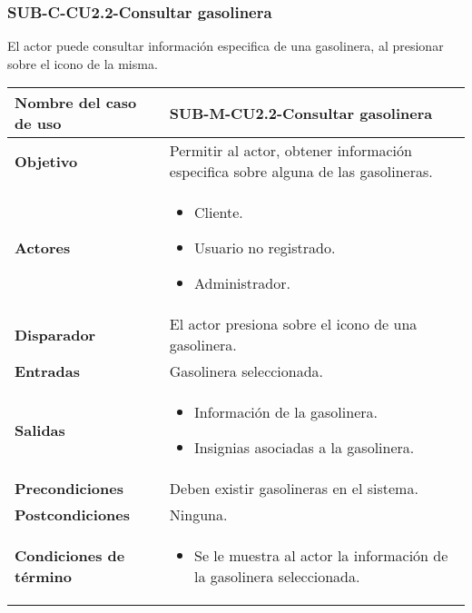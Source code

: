 \subsubsection{SUB-C-CU2.2-Consultar gasolinera}\label{SUB-C-CU2.2}
El actor puede consultar información especifica de una gasolinera, al presionar sobre el icono de la misma.

\begin{longtable}{|J{5cm}|J{10.3cm}|}
	\hline
	\textbf{Nombre del caso de uso} &
		SUB-M-CU2.2-Consultar gasolinera \\ \hline
	\textbf{Objetivo} &
		Permitir al actor, obtener información especifica sobre alguna de las gasolineras. \\ \hline
	\textbf{Actores} &
		\begin{itemize}
			\item Cliente.
			\item Usuario no registrado.
			\item Administrador.
		\end{itemize}
		 \\ \hline 
	\textbf{Disparador} & 
		El actor presiona sobre el icono de una gasolinera. \\ \hline 
	\textbf{Entradas} & Gasolinera seleccionada.
		\\ \hline 
	\textbf{Salidas} & 
		\begin{itemize}
			\item Información de la gasolinera.
			\item Insignias asociadas a la gasolinera.
		\end{itemize} \\ \hline
	\textbf{Precondiciones} &
		Deben existir gasolineras en el sistema.\\ \hline
	\textbf{Postcondiciones} & Ninguna.
		\\ \hline
	\textbf{Condiciones de término} & 
		\begin{itemize}
			\item Se le muestra al actor la información de la gasolinera seleccionada.

\end{itemize}
\end{longtable}
